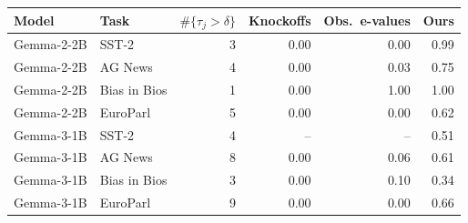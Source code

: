 \begin{tabular}{llrrrr}
\toprule
Model & Task & $\#\{\tau_j>\delta\}$ & Knockoffs & Obs.\ e-values & Ours \\
\midrule
Gemma-2-2B & SST-2 & 3 & 0.00 & 0.00 & 0.99 \\
Gemma-2-2B & AG News & 4 & 0.00 & 0.03 & 0.75 \\
Gemma-2-2B & Bias in Bios & 1 & 0.00 & 1.00 & 1.00 \\
Gemma-2-2B & EuroParl & 5 & 0.00 & 0.00 & 0.62 \\
Gemma-3-1B & SST-2 & 4 & -- & -- & 0.51 \\
Gemma-3-1B & AG News & 8 & 0.00 & 0.06 & 0.61 \\
Gemma-3-1B & Bias in Bios & 3 & 0.00 & 0.10 & 0.34 \\
Gemma-3-1B & EuroParl & 9 & 0.00 & 0.00 & 0.66 \\
\bottomrule
\end{tabular}
